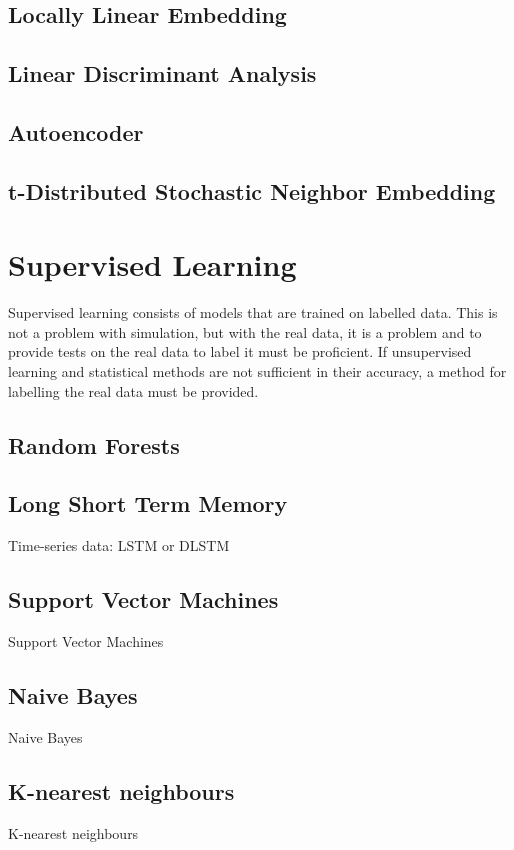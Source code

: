 \subsection{Locally Linear Embedding}
\subsection{Linear Discriminant Analysis}
\subsection{Autoencoder}
\subsection{t-Distributed Stochastic Neighbor Embedding}

\section{Supervised Learning}
Supervised learning consists of models that are trained on labelled data. This is not a problem with simulation, but with the real data, it is a problem and to provide tests on the real data to label it must be proficient. If unsupervised learning and statistical methods are not sufficient in their accuracy, a method for labelling the real data must be provided.

\subsection{Random Forests}
\cite{Shi2006, Paul2018, Primartha2018}

\subsection{Long Short Term Memory}
Time-series data: LSTM or DLSTM

\subsection{Support Vector Machines}
Support Vector Machines

\subsection{Naive Bayes}
Naive Bayes

\subsection{K-nearest neighbours}
K-nearest neighbours

